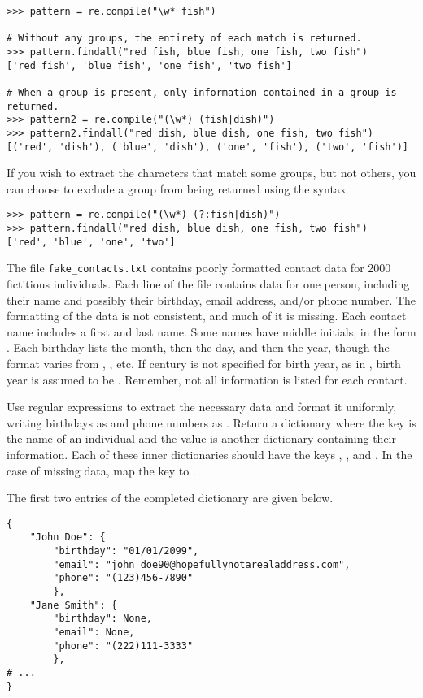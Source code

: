 \begin{lstlisting}
>>> pattern = re.compile("\w* fish")

# Without any groups, the entirety of each match is returned.
>>> pattern.findall("red fish, blue fish, one fish, two fish")
['red fish', 'blue fish', 'one fish', 'two fish']

# When a group is present, only information contained in a group is returned.
>>> pattern2 = re.compile("(\w*) (fish|dish)")
>>> pattern2.findall("red dish, blue dish, one fish, two fish")
[('red', 'dish'), ('blue', 'dish'), ('one', 'fish'), ('two', 'fish')]
\end{lstlisting}

If you wish to extract the characters that match some groups, but not others, you can choose to exclude a group from being returned using the syntax 

\begin{lstlisting}
>>> pattern = re.compile("(\w*) (?:fish|dish)")
>>> pattern.findall("red dish, blue dish, one fish, two fish")
['red', 'blue', 'one', 'two']
\end{lstlisting}


\begin{problem}
The file \texttt{fake\_contacts.txt} contains poorly formatted contact data for 2000 fictitious individuals.
Each line of the file contains data for one person, including their name and possibly their birthday, email address, and/or phone number.
The formatting of the data is not consistent, and much of it is missing.
Each contact name includes a first and last name. Some names have middle initials, in the form .
Each birthday lists the month, then the day, and then the year, though the format varies from , , etc.
If century is not specified for birth year, as in , birth year is assumed to be .
Remember, not all information is listed for each contact.

Use regular expressions to extract the necessary data and format it uniformly, writing birthdays as  and phone numbers as .
Return a dictionary where the key is the name of an individual and the value is another dictionary containing their information.
Each of these inner dictionaries should have the keys , , and .
In the case of missing data, map the key to .

The first two entries of the completed dictionary are given below.

\begin{lstlisting}
{
    "John Doe": {
        "birthday": "01/01/2099",
        "email": "john_doe90@hopefullynotarealaddress.com",
        "phone": "(123)456-7890"
        },
    "Jane Smith": {
        "birthday": None,
        "email": None,
        "phone": "(222)111-3333"
        },
# ...
}
\end{lstlisting}
\end{problem}


